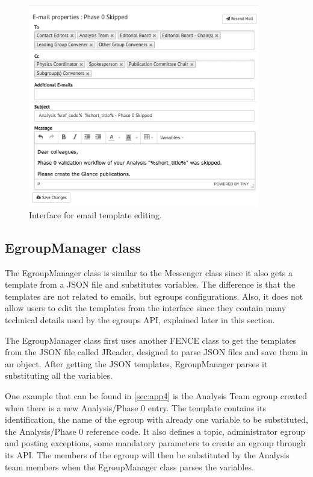 \begin{figure}[ht!]
  \centering
  \includegraphics[width=0.9\textwidth]{figures/email_template_editing.png}
  \caption{Interface for email template editing.}
  \label{fig:email_template_editing}
\end{figure}

\subsection{EgroupManager class}
\label{sec:EgroupManager_class}
The EgroupManager class is similar to the Messenger class since it also gets a template from a JSON file and substitutes variables. The difference is that the templates are not related to emails, but egroups configurations. Also, it does not allow users to edit the templates from the interface since they contain many technical details used by the egroups API, explained later in this section.

The EgroupManager class first uses another FENCE class to get the templates from the JSON file called JReader, designed to parse JSON files and save them in an object. After getting the JSON templates, EgroupManager parses it substituting all the variables.

One example that can be found in \ref{sec:app4} is the Analysis Team egroup created when there is a new Analysis/Phase 0 entry. The template contains its identification, the name of the egroup with already one variable to be substituted, the Analysis/Phase 0 reference code. It also defines a topic, administrator egroup and posting exceptions, some mandatory parameters to create an egroup through its API. The members of the egroup will then be substituted by the Analysis team members when the EgroupManager class parses the variables.

